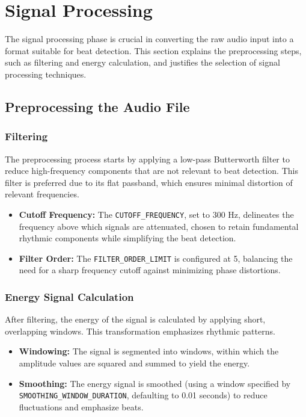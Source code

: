 \section{Signal Processing}

The signal processing phase is crucial in converting the raw audio input into a format suitable for beat detection. This section explains the preprocessing steps, such as filtering and energy calculation, and justifies the selection of signal processing techniques.

\subsection{Preprocessing the Audio File}

\subsubsection{Filtering}

The preprocessing process starts by applying a low-pass Butterworth filter to reduce high-frequency components that are not relevant to beat detection. This filter is preferred due to its flat passband, which ensures minimal distortion of relevant frequencies.

\begin{itemize}
    \item \textbf{Cutoff Frequency:} The \texttt{CUTOFF\_FREQUENCY}, set to 300 Hz, delineates the frequency above which signals are attenuated, chosen to retain fundamental rhythmic components while simplifying the beat detection.
    \item \textbf{Filter Order:} The \texttt{FILTER\_ORDER\_LIMIT} is configured at 5, balancing the need for a sharp frequency cutoff against minimizing phase distortions.
\end{itemize}

\subsubsection{Energy Signal Calculation}

After filtering, the energy of the signal is calculated by applying short, overlapping windows. This transformation emphasizes rhythmic patterns.

\begin{itemize}
    \item \textbf{Windowing:} The signal is segmented into windows, within which the amplitude values are squared and summed to yield the energy.
    \item \textbf{Smoothing:} The energy signal is smoothed (using a window specified by \texttt{SMOOTHING\_WINDOW\_DURATION}, defaulting to 0.01 seconds) to reduce fluctuations and emphasize beats.
\end{itemize}

